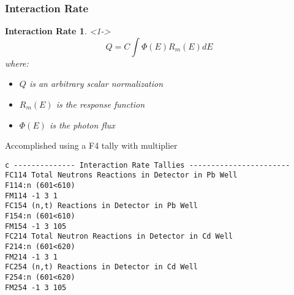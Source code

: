 \begin{frame}[fragile]
\frametitle{Interaction Rate}
	\tiny
	\newtheorem{thm11}{Interaction Rate}
	\begin{thm11}<1->
		$$Q = C \int {\Phi(E) R_m(E) dE }$$
	where:
	\begin{itemize}
		\item $Q$ is an arbitrary scalar normalization
		\item $R_m(E)$ is the response function
		\item $\Phi(E)$ is the photon flux
	\end{itemize}
	\end{thm11}
Accomplished using a F4 tally with multiplier
\tiny
\begin{lstlisting}
c -------------- Interaction Rate Tallies -----------------------
FC114 Total Neutrons Reactions in Detector in Pb Well
F114:n (601<610)
FM114 -1 3 1
FC154 (n,t) Reactions in Detector in Pb Well
F154:n (601<610)
FM154 -1 3 105
FC214 Total Neutron Reactions in Detector in Cd Well
F214:n (601<620)
FM214 -1 3 1
FC254 (n,t) Reactions in Detector in Cd Well
F254:n (601<620)
FM254 -1 3 105
\end{lstlisting}
\end{frame}


